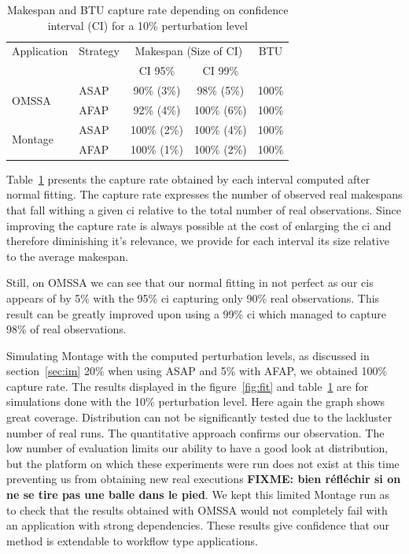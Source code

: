 \documentclass[10pt,conference,compsocconf]{IEEEtran}
\begin{document}
\begin{table}
	\centering
	\caption{Makespan and BTU capture rate depending on confidence interval
          (CI) for a 10\% perturbation level}\label{tab:fit}
	\begin{tabular}{llccc}
		\toprule
		Application&Strategy&\multicolumn{2}{c}{Makespan (Size of CI)}&BTU\\
                           &         & CI 95\% & CI 99\% &\\
		\midrule
		\multirow{2}{*}{OMSSA}&ASAP&  90\% (3\%)&  98\% (5\%)& 100\%\\
				      &AFAP&  92\% (4\%)& 100\% (6\%)& 100\%\\
		\midrule
		\multirow{2}{*}{Montage}&ASAP& 100\% (2\%)& 100\% (4\%)& 100\%\\
					&AFAP& 100\% (1\%)& 100\% (2\%)& 100\%\\
		\bottomrule
	\end{tabular}
\end{table}

Table~\ref{tab:fit} presents the capture rate obtained by each interval
computed after normal fitting. The capture rate expresses the number of observed
real makespans that fall withing a given \ac{ci} relative to the total number of real
observations. Since improving the capture rate is always possible at the cost of
enlarging the \ac{ci} and therefore diminishing it's relevance, we provide for
each interval its size relative to the average makespan. 

Still, on OMSSA we can see that our normal fitting in not perfect as our \acp{ci}
appears of by 5\% with the 95\% \ac{ci} capturing only 90\% real observations.
This result can be greatly improved upon using a 99\% \ac{ci} which managed to
capture 98\% of real observations.

Simulating Montage with the computed perturbation levels, as discussed in
section~\ref{sec:im} 20\% when using ASAP and 5\% with AFAP, we obtained 100\%
capture rate. The results displayed in the figure~\ref{fig:fit} and
table~\ref{tab:fit} are for simulations done with the 10\% perturbation level.   
Here again the graph shows great coverage. Distribution can not be significantly
tested due to the lackluster number of real runs. The quantitative approach
confirms our observation. The low number of evaluation limits our ability to
have a good look at distribution, but the platform on which these experiments
were run does not exist at this time preventing us from obtaining new real
executions \textbf{FIXME: bien réfléchir si on ne se tire pas une balle dans le
  pied}.
 We kept this limited Montage run as to check that the results
obtained with OMSSA would not completely fail with an application with strong
dependencies. These results give confidence that our method is extendable to
workflow type applications.  
\end{document}
